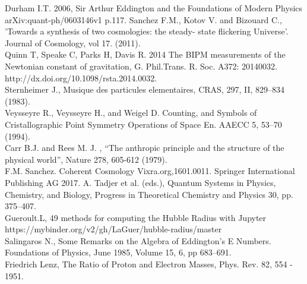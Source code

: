 \documentclass[a4paper,9pt]{article}
\begin{document}
\begin{thebibliography}{99}
 Durham I.T. 2006, Sir Arthur Eddington and the Foundations of Modern Physics arXiv:quant-ph/0603146v1  p.117.
 Sanchez F.M., Kotov V. and Bizouard C., 'Towards a synthesis of two cosmologies: the steady- state flickering Universe'. Journal of Cosmology, vol 17. (2011).\\
 Quinn T, Speake C, Parks H, Davis R. 2014 The BIPM measurements of the Newtonian constant of gravitation, G. Phil.Trans. R. Soc. A372: 20140032. http://dx.doi.org/10.1098/rsta.2014.0032. \\
 Sternheimer J., Musique des particules elementaires, CRAS, 297, II, 829--834 (1983).\\
 Veysseyre R., Veysseyre H., and Weigel D. Counting, and Symbols of Cristallographic Point Symmetry Operations of Space En. AAECC 5, 53--70 (1994).\\
 Carr B.J. and Rees M. J. , “The anthropic principle and the structure of the physical world”, Nature 278, 605-612 (1979).\\
 F.M. Sanchez. Coherent Cosmology Vixra.org,1601.0011. Springer International Publishing AG 2017. A. Tadjer et al. (eds.), Quantum Systems in Physics, Chemistry, and Biology, Progress in Theoretical Chemistry and Physics 30, pp. 375--407. \\ 
 Gueroult.L, 49 methods for computing the Hubble Radius with Jupyter https://mybinder.org/v2/gh/LaGuer/hubble-radius/master \\
 Salingaros N., Some Remarks on the Algebra of Eddington's E Numbers. Foundations of Physics, June 1985, Volume 15, 6, pp 683–691.\\
 Friedrich Lenz, The Ratio of Proton and Electron Masses, Phys. Rev. 82, 554 - 1951.\\


\end{thebibliography}
\end{document}
